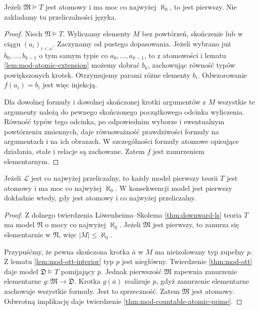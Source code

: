 \begin{twierdzenie}
\label{thm:mod-countable-atomic-prime}
Jeżeli $\mathfrak M\models T$ jest atomowy
i ma moc co najwyżej $\aleph_0$, to jest pierwszy.
Nie zakładamy tu przeliczalności języka.
\end{twierdzenie}
\begin{proof}
Niech $\mathfrak N\models T$.
Wyliczamy elementy $M$ bez powtórzeń, skończenie
lub w ciągu $(a_i)_{i<\omega}$.
Zaczynamy od pustego dopasowania.
Jeżeli wybrano już $b_0,\ldots,b_{k-1}$
o tym samym typie co $a_0,\ldots,a_{k-1}$,
to z atomowości i lematu
\ref{lem:mod-atomic-extension} możemy dobrać $b_k$,
zachowując równość typów powiększonych krotek.
Otrzymujemy parami różne elementy $b_i$.
Odwzorowanie $f(a_i)=b_i$ jest więc injekcją.

Dla dowolnej formuły i dowolnej skończonej krotki
argumentów z $M$ wszystkie te argumenty należą
do pewnego skończonego początkowego odcinka
wyliczenia. Równość typów tego odcinka, po
odpowiednim wyborze i ewentualnym powtórzeniu
zmiennych, daje równoważność prawdziwości
formuły na argumentach i na ich obrazach.
W szczególności formuły atomowe opisujące
działania, stałe i relacje są zachowane.
Zatem $f$ jest zanurzeniem elementarnym.
\end{proof}

\begin{twierdzenie}
\label{thm:mod-prime-atomic-countable}
Jeżeli $\mathcal L$ jest co najwyżej przeliczalny,
to każdy model pierwszy teorii $T$ jest atomowy
i ma moc co najwyżej $\aleph_0$.
W konsekwencji model jest pierwszy dokładnie
wtedy, gdy jest atomowy i co najwyżej przeliczalny.
\end{twierdzenie}
\begin{proof}
Z dolnego twierdzenia Löwenheima--Skolema
\ref{thm:downward-ls} teoria $T$ ma model
$\mathfrak N$ o mocy co najwyżej $\aleph_0$.
Jeżeli $\mathfrak M$ jest pierwszy, to zanurza
się elementarnie w $\mathfrak N$,
więc $|M|\leq\aleph_0$.

Przypuśćmy, że pewna skończona krotka $\bar a$
w $M$ ma nieizolowany typ zupełny $p$.
Z lematu \ref{lem:mod-ott-interior} typ $p$
jest niegłówny. Twierdzenie \ref{thm:mod-ott}
daje model $\mathfrak D\models T$ pomijający $p$.
Jednak pierwszość $\mathfrak M$ zapewnia zanurzenie
elementarne $g:\mathfrak M\to\mathfrak D$.
Krotka $g(\bar a)$ realizuje $p$, gdyż zanurzenie
elementarne zachowuje wszystkie formuły.
Jest to sprzeczność. Zatem $\mathfrak M$
jest atomowy. Odwrotną implikację daje twierdzenie
\ref{thm:mod-countable-atomic-prime}.
\end{proof}

